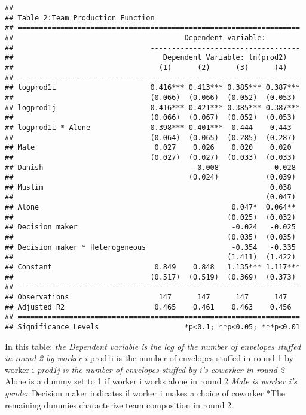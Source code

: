 \documentclass[
]{article}
\begin{document}
\begin{verbatim}
## 
## Table 2:Team Production Function
## ==================================================================
##                                        Dependent variable:        
##                                -----------------------------------
##                                   Dependent Variable: ln(prod2)   
##                                  (1)      (2)      (3)      (4)   
## ------------------------------------------------------------------
## logprod1i                      0.416*** 0.413*** 0.385*** 0.387***
##                                (0.066)  (0.066)  (0.052)  (0.053) 
## logprod1j                      0.416*** 0.421*** 0.385*** 0.387***
##                                (0.066)  (0.067)  (0.052)  (0.053) 
## logprod1i * Alone              0.398*** 0.401***  0.444    0.443  
##                                (0.064)  (0.065)  (0.285)  (0.287) 
## Male                            0.027    0.026    0.020    0.020  
##                                (0.027)  (0.027)  (0.033)  (0.033) 
## Danish                                   -0.008            -0.028 
##                                         (0.024)           (0.039) 
## Muslim                                                     0.038  
##                                                           (0.047) 
## Alone                                             0.047*  0.064** 
##                                                  (0.025)  (0.032) 
## Decision maker                                    -0.024   -0.025 
##                                                  (0.035)  (0.035) 
## Decision maker * Heterogeneous                    -0.354   -0.335 
##                                                  (1.411)  (1.422) 
## Constant                        0.849    0.848   1.135*** 1.117***
##                                (0.517)  (0.519)  (0.369)  (0.373) 
## ------------------------------------------------------------------
## Observations                     147      147      147      147   
## Adjusted R2                     0.465    0.461    0.463    0.456  
## ==================================================================
## Significance Levels                    *p<0.1; **p<0.05; ***p<0.01
\end{verbatim}

In this table: \emph{the Dependent variable is the log of the number of
envelopes stuffed in round 2 by worker i }prod1i is the number of
envelopes stuffed in round 1 by worker i \emph{prod1j is the number of
envelopes stuffed by i's coworker in round 2 }Alone is a dummy set to 1
if worker i works alone in round 2 \emph{Male is worker i's gender
}Decision maker indicates if worker i makes a choice of coworker *The
remaining dummies characterize team composition in round 2.
\end{document}
